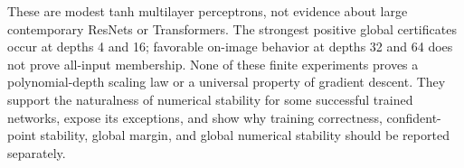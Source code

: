 These are modest tanh multilayer perceptrons, not evidence about large
contemporary ResNets or Transformers. The strongest positive global
certificates occur at depths 4 and 16; favorable on-image behavior at
depths 32 and 64 does not prove all-input membership. None of these finite
experiments proves a polynomial-depth scaling law or a universal property
of gradient descent. They support the naturalness of numerical stability
for some successful trained networks, expose its exceptions, and show why
training correctness, confident-point stability, global margin, and global
numerical stability should be reported separately.
